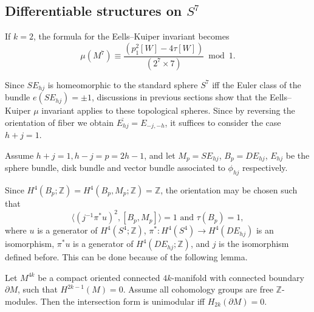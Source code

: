 \documentclass[twoside]{article}
\begin{document}
\subsection{Differentiable structures on \texorpdfstring{$S^7$}{S7}}


If $k = 2$, the formula for the Eells--Kuiper invariant becomes
\[
    \mu\left(M^{7}\right)  \equiv \frac{\left(p_{1}^{2}[W]-4 \tau[W]\right) }{ (2^{7} \times 7)}  \bmod 1. 
\]

Since $SE_{hj}$ is homeomorphic to the standard sphere $S^7$ iff the Euler class of the bundle  $e(SE_{hj}) = \pm 1$, discussions in previous sections show that the Eells--Kuiper $\mu$ invariant applies to these topological spheres. Since by reversing the orientation of fiber we obtain  $\overline{E_{hj}} = E_{-j,-h}$, it suffices to consider the case $h + j = 1$. 

Assume $h + j = 1, h-j = p = 2h-1$, and let $M_p = SE_{hj}$,  $B_p = DE_{hj}$, $E_{hj}$ be the sphere bundle, disk bundle and vector bundle associated to $\phi_{hj}$ respectively. 

Since $H^4(B_p;\mathbb{Z}) = H^4(B_p,M_p;\mathbb{Z}) = \mathbb{Z}$, the orientation may be chosen such that
\[
    \langle(j^{-1}\pi^*u)^2,[B_p,M_p]\rangle = 1\text{ and }\tau(B_p) = 1, 
\]
where $u$ is a generator of $H^4(S^4;\mathbb{Z})$, $\pi^* \colon H^4(S^4) \to  H^4(DE_{hj})$ is an isomorphism,  $\pi^*u$ is a generator of $H^4(DE_{hj};\mathbb{Z})$, and $j$ is the isomorphism defined before. This can be done because of the following lemma. 


\begin{lem}
    Let $M^{4k}$ be a compact oriented connected $4k$-manifold with connected boundary $\partial M$, such that $H^{2k-1}(M) = 0$. Assume all cohomology groups are free $\mathbb{Z}$-modules. Then the intersection form is unimodular iff $H_{2k}(\partial M) = 0$. 
\end{lem}
\end{document}
